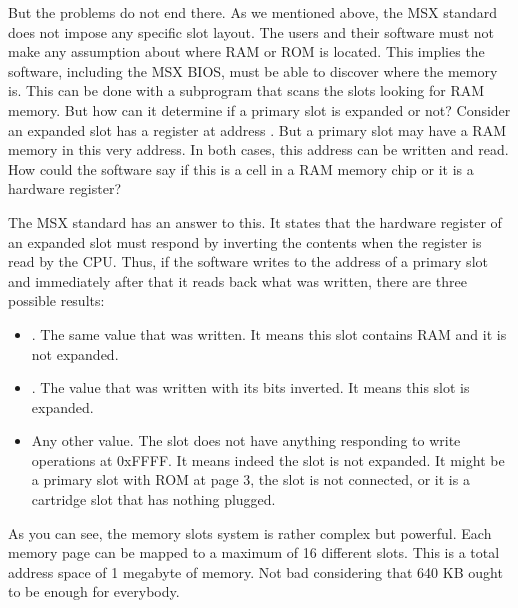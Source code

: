 But the problems do not end there. As we mentioned above, the MSX standard does not impose any specific slot layout. The users and their software must not make any assumption about where RAM or ROM is located. This implies the software, including the MSX BIOS, must be able to discover where the memory is. This can be done with a subprogram that scans the slots looking for RAM memory. But how can it determine if a primary slot is expanded or not? Consider an expanded slot has a register at address . But a primary slot may have a RAM memory in this very address. In both cases, this address can be written and read. How could the software say if this is a cell in a RAM memory chip or it is a hardware register?

The MSX standard has an answer to this. It states that the hardware register of an expanded slot must respond by inverting the contents when the register is read by the CPU. Thus, if the software writes  to the address  of a primary slot and immediately after that it reads back what was written, there are three possible results:

\begin{itemize}
	\item {}. The same value that was written. It means this slot contains RAM and it is not expanded.
	\item {}. The value that was written with its bits inverted. It means this slot is expanded.
	\item Any other value. The slot does not have anything responding to write operations at 0xFFFF. It means indeed the slot is not expanded. It might be a primary slot with ROM at page 3, the slot is not connected, or it is a cartridge slot that has nothing plugged.
\end{itemize}

As you can see, the memory slots system is rather complex but powerful. Each memory page can be mapped to a maximum of 16 different slots. This is a total address space of 1 megabyte of memory. Not bad considering that 640 KB ought to be enough for everybody. 

